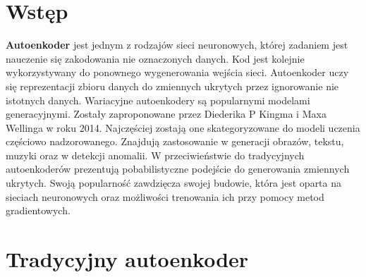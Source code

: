 \documentclass[a4paper,12pt]{book} %
\begin{document}
\sloppy



\thispagestyle{empty}




\tableofcontents{}

\chapter*{Wstęp} %
\textbf{Autoenkoder} jest jednym z rodzajów sieci neuronowych, której zadaniem jest nauczenie się zakodowania nie oznaczonych danych. Kod jest kolejnie wykorzystywany do ponownego wygenerowania wejścia sieci. Autoenkoder uczy się reprezentacji zbioru danych do zmiennych ukrytych przez ignorowanie nie istotnych danych.
Wariacyjne autoenkodery są popularnymi modelami generacyjnymi. Zostały zaproponowane przez Diederika P Kingma i Maxa Wellinga w roku 2014\cite{kingma2014autoencoding}. Najczęściej zostają one skategoryzowane do modeli uczenia częściowo nadzorowanego. Znajdują zastosowanie w generacji obrazów, tekstu, muzyki oraz w detekcji anomalii. W przeciwieństwie do tradycyjnych autoenkoderów prezentują pobabilistyczne podejście do generowania zmiennych ukrytych. Swoją popularność zawdzięcza swojej budowie, która jest oparta na sieciach neuronowych oraz możliwości trenowania ich przy pomocy metod gradientowych.
\chapter{Tradycyjny autoenkoder} 
\end{document}
